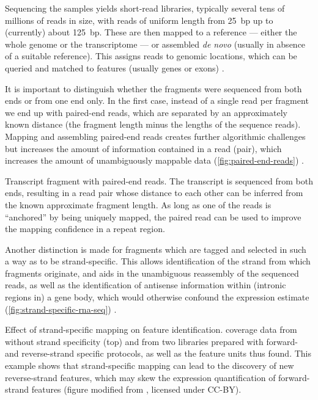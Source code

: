Sequencing the \rnaseq samples yields short-read libraries, typically several
tens of millions of reads in size, with reads of uniform length from \SI{25}{bp}
up to (currently) about \SI{125}{bp}. These are then mapped to a reference ---
either the whole genome or the transcriptome --- or assembled \emph{de novo}
(usually in absence of a suitable reference). This assigns reads to genomic
locations, which can be queried and matched to features (usually genes or
exons) \citep{Cox:2007,Kim:2013,Anders:2014}.

It is important to distinguish whether the \cdna fragments were sequenced from
both ends or from one end only. In the first case, instead of a single read per
fragment we end up with paired-end reads, which are separated by an
approximately known distance (the fragment length minus the lengths of the
sequence reads). Mapping and assembling paired-end reads creates further
algorithmic challenges but increases the amount of information contained in a
read (pair), which increases the amount of unambiguously mappable data
(\cref{fig:paired-end-reads}) \citep{Langmead:2012}.

    {Transcript fragment with paired-end reads.}
    {The transcript is sequenced from both ends, resulting in a read pair whose
    distance to each other can be inferred from the known approximate fragment
    length. As long as one of the reads is “anchored” by being uniquely mapped,
    the paired read can be used to improve the mapping confidence in a repeat
    region.}

Another distinction is made for fragments which are tagged and selected in such
a way as to be strand-specific. This allows identification of the strand from
which fragments originate, and aids in the unambiguous reassembly of the
sequenced reads, as well as the identification of antisense information within
(intronic regions in) a gene body, which would otherwise confound the expression
estimate (\cref{fig:strand-specific-rna-seq}) \citep{Yassour:2010}.

    {Effect of strand-specific mapping on feature identification.}
    {\rnaseq coverage data from  without strand specificity (top)
    and from two libraries prepared with forward- and reverse-strand specific
    protocols, as well as the feature units thus found. This example shows that
    strand-specific mapping can lead to the discovery of new reverse-strand
    features, which may skew the expression quantification of forward-strand
    features (figure modified from \citet{Yassour:2010}, licensed under CC-BY).}


